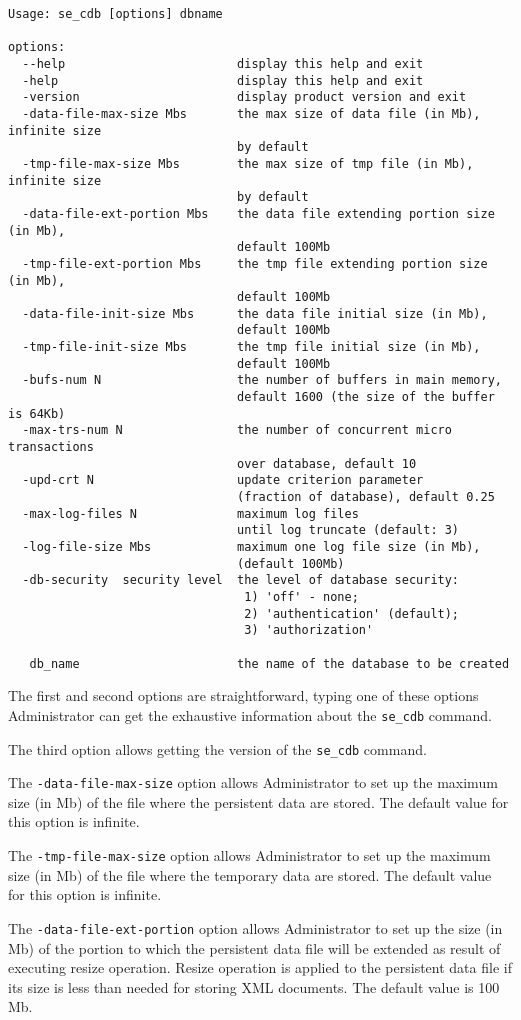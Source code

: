 \documentclass[a4paper,12pt]{article}
\begin{document}
\begin{verbatim}
Usage: se_cdb [options] dbname

options:
  --help		 				display this help and exit
  -help							display this help and exit
  -version						display product version and exit
  -data-file-max-size Mbs		the max size of data file (in Mb), infinite size
								by default
  -tmp-file-max-size Mbs		the max size of tmp file (in Mb), infinite size
								by default
  -data-file-ext-portion Mbs	the data file extending portion size (in Mb),
								default 100Mb
  -tmp-file-ext-portion Mbs		the tmp file extending portion size (in Mb),
								default 100Mb
  -data-file-init-size Mbs		the data file initial size (in Mb),
								default 100Mb
  -tmp-file-init-size Mbs		the tmp file initial size (in Mb),
								default 100Mb
  -bufs-num N					the number of buffers in main memory,
								default 1600 (the size of the buffer is 64Kb)
  -max-trs-num N				the number of concurrent micro transactions
								over database, default 10
  -upd-crt N					update criterion parameter
								(fraction of database), default 0.25
  -max-log-files N              maximum log files
                                until log truncate (default: 3)
  -log-file-size Mbs            maximum one log file size (in Mb),
                                (default 100Mb)
  -db-security  security level  the level of database security:
								 1) 'off' - none;
								 2) 'authentication' (default);
								 3) 'authorization'

   db_name   					the name of the database to be created
\end{verbatim}


The first and second options are straightforward, typing one of these options Administrator can get the exhaustive information about the \verb!se_cdb! command.

The third option allows getting the version of the \verb!se_cdb! command.

The \verb!-data-file-max-size! option allows Administrator to set up the maximum size (in Mb) of the file where the persistent data are stored. The default value for this option is infinite.

The \verb!-tmp-file-max-size! option allows Administrator to set up the maximum size (in Mb) of the file where the temporary data are stored. The default value for this option is infinite.

The \verb!-data-file-ext-portion! option allows Administrator to set up the size (in Mb) of the portion to which the persistent data file will be extended as result of executing resize operation. Resize operation is applied to the persistent data file if its size is less than needed for storing XML documents. The default value is 100 Mb.
\end{document}

